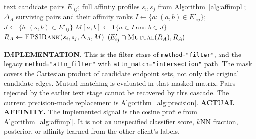 \documentclass[11pt]{article}
\newcommand{\mutual}{\textsc{Mutual}}
\newcommand{\fprank}{\textsc{FPSIRank}}
\newcommand{\ind}{\mathbf{1}}
\begin{document}
\begin{algorithm}[p]
\caption{Image-affinity intersection filter: original cascade}
\label{alg:a4}
\small\begin{algorithmic}[1]
\Require text candidate pairs $E'_{ij}$; full affinity profiles $s_i,s_j$ from Algorithm~\ref{alg:affimpl}; $\Delta_A$
\Ensure surviving pairs and their affinity ranks
 \State $I\gets\{a:(a,b)\in E'_{ij}\}$; $J\gets\{b:(a,b)\in E'_{ij}\}$
 \State $M[a,b]\gets\ind\{a\in I\ \text{and}\ b\in J\}$
 \State $R_A\gets\fprank(s_i,s_j,\Delta_A,M)$
 \State \Return $(E'_{ij}\cap\mutual(R_A),R_A)$
\EndProcedure
\Statex \hrulefill
\Statex \raggedright\textbf{IMPLEMENTATION.} This is the filter stage of
\texttt{method="filter"}, and the legacy
\texttt{method="attn\_filter"} with \texttt{attn\_match="intersection"} path.
The mask covers the Cartesian product of candidate endpoint sets, not only the
original candidate edges. Mutual matching is evaluated in that masked matrix.
Pairs rejected by the earlier text stage cannot be recovered by this cascade.
The current precision-mode replacement is Algorithm~\ref{alg:precision}.
\Statex
\Statex \textbf{ACTUAL AFFINITY.} The implemented signal is the cosine profile
from Algorithm~\ref{alg:affimpl}. It is not an unspecified classifier score,
$k$NN fraction, posterior, or affinity learned from the other client's labels.
\end{algorithmic}\end{algorithm}
\end{document}
